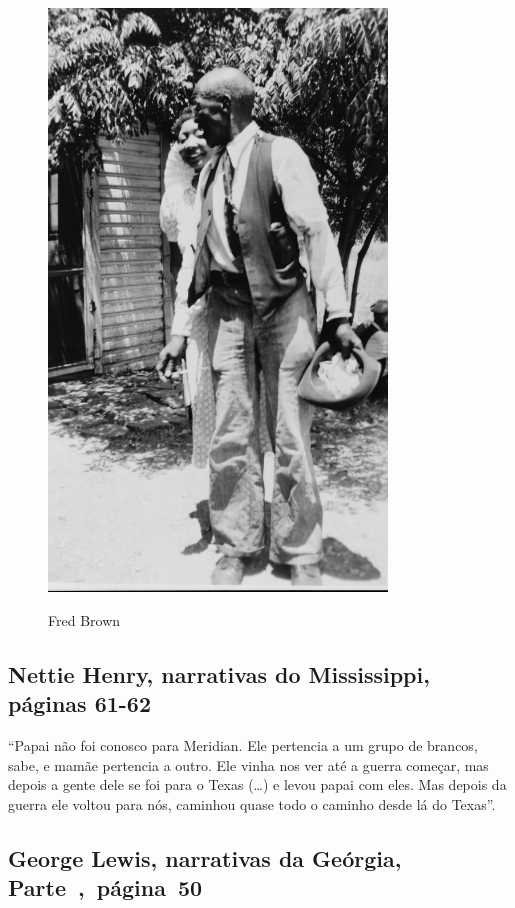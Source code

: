 \pagebreak
\thispagestyle{empty}
\begin{figure}[!ht]
\centering
 \includegraphics[width=90mm]{./imgs/fredbrown_recorte.jpg} \label{img12}
\caption{Fred Brown}
\end{figure}

\subsection{Nettie Henry, narrativas do Mississippi, páginas 61-62}
\label{ref142}

``Papai não foi conosco para Meridian. Ele pertencia a um grupo de
brancos, sabe, e mamãe pertencia a outro. Ele vinha nos ver até a guerra
começar, mas depois a gente dele se foi para o Texas (\ldots{}) e levou
papai com eles. Mas depois da guerra ele voltou para nós, caminhou quase
todo o caminho desde lá do Texas''.

\subsection{George Lewis, narrativas da Geórgia, Parte~,~página~50}
\label{ref173}

